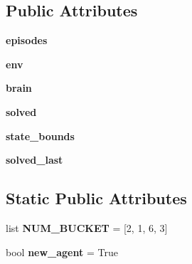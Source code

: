 \subsection*{Public Attributes}
\begin{DoxyCompactItemize}
\item 
{\bfseries episodes}\hypertarget{classRLBrain__tester_1_1CartPoleProblem_a19f1af13da65cf2731e9908ffe58c9b0}{}\label{classRLBrain__tester_1_1CartPoleProblem_a19f1af13da65cf2731e9908ffe58c9b0}

\item 
{\bfseries env}\hypertarget{classRLBrain__tester_1_1CartPoleProblem_a04375e27109af6967aab65c97f9990e1}{}\label{classRLBrain__tester_1_1CartPoleProblem_a04375e27109af6967aab65c97f9990e1}

\item 
{\bfseries brain}\hypertarget{classRLBrain__tester_1_1CartPoleProblem_ad1284ea3bb0e8c03aced6946b12aa1ee}{}\label{classRLBrain__tester_1_1CartPoleProblem_ad1284ea3bb0e8c03aced6946b12aa1ee}

\item 
{\bfseries solved}\hypertarget{classRLBrain__tester_1_1CartPoleProblem_ada699ddbf66c43a26c1c330e1f3cf9b4}{}\label{classRLBrain__tester_1_1CartPoleProblem_ada699ddbf66c43a26c1c330e1f3cf9b4}

\item 
{\bfseries state\+\_\+bounds}\hypertarget{classRLBrain__tester_1_1CartPoleProblem_ad56dd1e6adcac0f3fdcca7c85f9d766f}{}\label{classRLBrain__tester_1_1CartPoleProblem_ad56dd1e6adcac0f3fdcca7c85f9d766f}

\item 
{\bfseries solved\+\_\+last}\hypertarget{classRLBrain__tester_1_1CartPoleProblem_add931a7ad2c24ef5a01148de1c86788b}{}\label{classRLBrain__tester_1_1CartPoleProblem_add931a7ad2c24ef5a01148de1c86788b}

\end{DoxyCompactItemize}
\subsection*{Static Public Attributes}
\begin{DoxyCompactItemize}
\item 
list {\bfseries N\+U\+M\+\_\+\+B\+U\+C\+K\+ET} = \mbox{[}2, 1, 6, 3\mbox{]}\hypertarget{classRLBrain__tester_1_1CartPoleProblem_a8cee97e9dac1f87199a0a481292bebb6}{}\label{classRLBrain__tester_1_1CartPoleProblem_a8cee97e9dac1f87199a0a481292bebb6}

\item 
bool {\bfseries new\+\_\+agent} = True\hypertarget{classRLBrain__tester_1_1CartPoleProblem_ae9a0e6776268a11f31fc84b7bab20d67}{}\label{classRLBrain__tester_1_1CartPoleProblem_ae9a0e6776268a11f31fc84b7bab20d67}

\end{DoxyCompactItemize}


